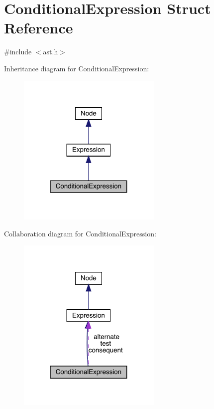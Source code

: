 \hypertarget{struct_conditional_expression}{}\section{Conditional\+Expression Struct Reference}
\label{struct_conditional_expression}


{\ttfamily \#include $<$ast.\+h$>$}



Inheritance diagram for Conditional\+Expression\+:\nopagebreak
\begin{figure}[H]
\begin{center}
\leavevmode
\includegraphics[width=196pt]{struct_conditional_expression__inherit__graph}
\end{center}
\end{figure}


Collaboration diagram for Conditional\+Expression\+:\nopagebreak
\begin{figure}[H]
\begin{center}
\leavevmode
\includegraphics[width=196pt]{struct_conditional_expression__coll__graph}
\end{center}
\end{figure}
